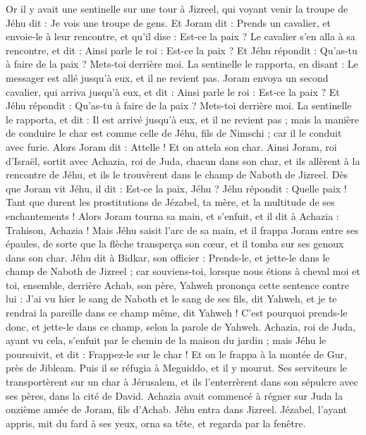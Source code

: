 \begin{multicols}{2}
Or il y avait une sentinelle sur une tour à Jizreel, qui voyant venir la troupe de Jéhu dit : Je vois une troupe de gens. Et Joram dit : Prends un cavalier, et envoie-le à leur rencontre, et qu’il dise : Est-ce la paix ?
Le cavalier s’en alla à sa rencontre, et dit : Ainsi parle le roi : Est-ce la paix ? Et Jéhu répondit : Qu’as-tu à faire de la paix ? Mets-toi derrière moi. La sentinelle le rapporta, en disant : Le messager est allé jusqu’à eux, et il ne revient pas.
Joram envoya un second cavalier, qui arriva jusqu’à eux, et dit : Ainsi parle le roi : Est-ce la paix ? Et Jéhu répondit : Qu’as-tu à faire de la paix ? Mets-toi derrière moi.
La sentinelle le rapporta, et dit : Il est arrivé jusqu’à eux, et il ne revient pas ; mais la manière de conduire le char est comme celle de Jéhu, fils de Nimschi ; car il le conduit avec furie.
Alors Joram dit : Attelle ! Et on attela son char. Ainsi Joram, roi d’Israël, sortit avec Achazia, roi de Juda, chacun dans son char, et ils allèrent à la rencontre de Jéhu, et ils le trouvèrent dans le champ de Naboth de Jizreel.
Dès que Joram vit Jéhu, il dit : Est-ce la paix, Jéhu ? Jéhu répondit : Quelle paix ! Tant que durent les prostitutions de Jézabel, ta mère, et la multitude de ses enchantements !
Alors Joram tourna sa main, et s’enfuit, et il dit à Achazia : Trahison, Achazia !
Mais Jéhu saisit l’arc de sa main, et il frappa Joram entre ses épaules, de sorte que la flèche transperça son cœur, et il tomba sur ses genoux dans son char.
Jéhu dit à Bidkar, son officier : Prends-le, et jette-le dans le champ de Naboth de Jizreel ; car souviens-toi, lorsque nous étions à cheval moi et toi, ensemble, derrière Achab, son père, Yahweh prononça cette sentence contre lui :
J’ai vu hier le sang de Naboth et le sang de ses fils, dit Yahweh, et je te rendrai la pareille dans ce champ même, dit Yahweh ! C’est pourquoi prends-le donc, et jette-le dans ce champ, selon la parole de Yahweh.
Achazia, roi de Juda, ayant vu cela, s’enfuit par le chemin de la maison du jardin ; mais Jéhu le poursuivit, et dit : Frappez-le sur le char ! Et on le frappa à la montée de Gur, près de Jibleam. Puis il se réfugia à Meguiddo, et il y mourut.
Ses serviteurs le transportèrent sur un char à Jérusalem, et ils l’enterrèrent dans son sépulcre avec ses pères, dans la cité de David.
Achazia avait commencé à régner sur Juda la onzième année de Joram, fils d’Achab.
Jéhu entra dans Jizreel. Jézabel, l’ayant appris, mit du fard à ses yeux, orna sa tête, et regarda par la fenêtre.

\end{multicols}
